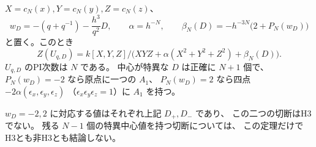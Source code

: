 \begin{theorem}[奇数位数のFricke中心と二つの非許容端点]
\label{thm:quantum-triangle-odd-centre}
$X=c_N(x),Y=c_N(y),Z=c_N(z)$、
\[
 w_D=-(q+q^{-1})-\frac{h^3}{q^2}D,\qquad
 \alpha=h^{-N},\qquad
 \beta_N(D)=-h^{-3N}\bigl(2+P_N(w_D)\bigr)
\]
と置く。このとき
\[
 Z(U_{q,D})=
 k[X,Y,Z]/\bigl(XYZ+\alpha(X^2+Y^2+Z^2)+\beta_N(D)\bigr).
\]
$U_{q,D}$ のPI次数は $N$ である。
中心が特異な $D$ は正確に $N+1$ 個で、
$P_N(w_D)=-2$ なら原点に一つの $A_1$、
$P_N(w_D)=2$ なら四点 $-2\alpha(\epsilon_x,\epsilon_y,\epsilon_z)$
（$\epsilon_x\epsilon_y\epsilon_z=1$）に $A_1$ を持つ。

$w_D=-2,2$ に対応する値はそれぞれ上記 $D_+,D_-$ であり、
この二つの切断はH3でない。
残る $N-1$ 個の特異中心値を持つ切断については、
この定理だけでH3とも非H3とも結論しない。
\end{theorem}
